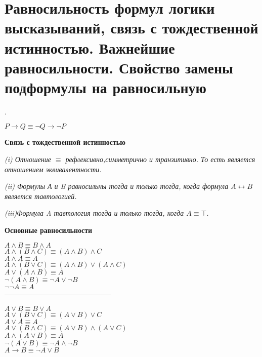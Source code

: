 \section{Равносильность формул логики высказываний, связь с тождественной истинностью. Важнейшие равносильности. Свойство замены подформулы
на равносильную}.
 \label{formula}
\begin{example}
  ${P}\to{Q}  \equiv \neg Q\to{\neg P} $
\end{example}
 
\begin{center}
 \textbf{Связь с тождественной истинностью}
\end{center}

{

}
\textit{(i) Отношение $\equiv$ рефлексивно,симметрично и
транзитивно. То есть является отношением эквивалентности.}
{

}
\textit{(ii) Формулы А и B равносильны тогда и только тогда, когда формула ${A}\leftrightarrow{B}$ является тавтологией.}{

}
\textit{(iii)Формула A тавтология тогда и только тогда, когда
${A}\equiv \top $.}

\begin{center}
 \textbf{Основные равносильности}
{

}
$A \wedge B  \equiv B \wedge A $ \\
$A \wedge(B \wedge C)  \equiv(A \wedge B) \wedge C $ \\
$A \wedge A  \equiv A $ \\
$A \wedge(B \vee C)  \equiv(A \wedge B) \vee(A \wedge C)$ \\
$A \vee(A \wedge B)  \equiv A$ \\
$ \neg(A \wedge B)  \equiv \neg A \vee \neg B$ \\
$\neg \neg A  \equiv  A $ \\
{---------------------------------------------}

$A \vee B  \equiv B \vee A $\\
$A \vee(B \vee C)  \equiv(A \vee B) \vee C $ \\
$A \vee A  \equiv A $  \\
$A \vee(B \wedge C)  \equiv(A \vee B) \wedge(A \vee C) $ \\
$A \wedge(A \vee B)  \equiv A $ \\
$\neg(A \vee B)  \equiv \neg A \wedge \neg B $ \\
$A \rightarrow B  \equiv \neg A \vee B $

\end{center}
 







